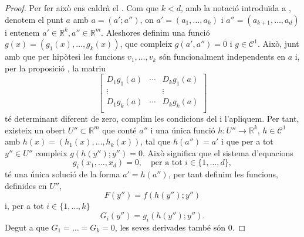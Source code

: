 \documentclass[../Apunts.tex]{subfiles}
\begin{document}
\begin{theorem}
\begin{proof}
			Per fer això ens caldrà el . Com que \(k<d\), amb la notació introduïda a , denotem el punt \(a\) amb \(a=(a';a'')\), on \(a'=(a_{1},\dots,a_{k})\) i \(a''=(a_{k+1},\dots,a_{d})\) i entenem \(a'\in\mathbb{R}^{k},a''\in\mathbb{R}^{m}\). Aleshores definim una funció \(g(x)=(g_{1}(x),\dots,g_{k}(x))\), que compleix \(g(a',a'')=0\) i \(g\in\mathcal{C}^{1}\). Això, junt amb que per hipòtesi les funcions \(v_{1},\dots,v_{k}\) són funcionalment independents en \(a\) i, per la proposició , la matriu
			\[\left[\begin{matrix}
			D_{1}g_{1}(a) & \cdots & D_{k}g_{1}(a)\\
			\vdots & & \vdots\\
			D_{1}g_{k}(a) & \cdots & D_{k}g_{k}(a)\\
			\end{matrix}\right]\]
			té determinant diferent de zero, complim les condicions del  i l'apliquem. Per tant, existeix un obert \(U''\subset\mathbb{R}^{m}\) que conté \(a''\) i una única funció \(h\colon U''\to\mathbb{R}^{k}\), \(h\in\mathcal{C}^{1}\) amb  \(h(x)=(h_{1}(x),\dots,h_{k}(x))\), tal que \(h(a'')=a'\) i que per a tot \(y''\in U''\) compleix \(g(h(y'');y'')=0\). Això significa que el sistema d'equacions
			\[g_{i}(x_{1},\dots,x_{d})=0,\quad\text{per a tot }i\in\{1,\dots,d\},\]
			té una única solució de la forma \(a'=h(a'')\), per tant definim les funcions, definides en \(U''\),
			\[F(y'')=f(h(y'');y'')\]
			i, per a tot \(i\in\{1,\dots,k\}\)
			\[G_{i}(y'')=g_{i}(h(y'');y'').\]
			Degut a que \(G_{1}=\dots=G_{k}=0\), les seves derivades també són \(0\).
		\end{proof}
	\end{theorem}
\end{document}
